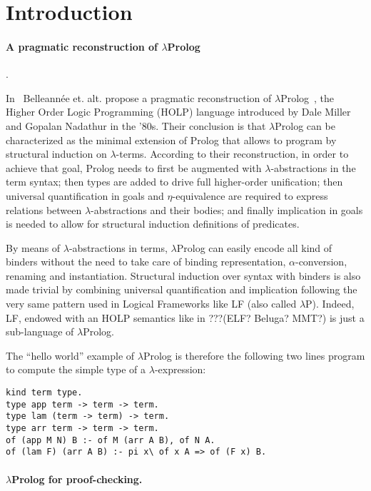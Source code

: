 \documentclass{easychair}
\begin{document}
\section{Introduction}

\paragraph{A pragmatic reconstruction of $\lambda$Prolog}.

In~\cite{jlp98} Belleannée et. alt. propose a pragmatic reconstruction
of $\lambda$Prolog~\cite{lambdap1,lambdap2,lambdap3}, the Higher Order
Logic Programming (HOLP) language introduced by Dale Miller and
Gopalan Nadathur in the '80s.
Their conclusion is that $\lambda$Prolog can be characterized as the
minimal extension of Prolog that allows to program by structural
induction on $\lambda$-terms. According to their reconstruction, in
order to achieve that goal, Prolog needs to first be augmented with
$\lambda$-abstractions in the term syntax; then types are added to
drive full higher-order unification; then universal quantification in
goals and $\eta$-equivalence are required to express relations between
$\lambda$-abstractions and their bodies; and finally implication in
goals is needed to allow for structural induction definitions of
predicates.

By means of $\lambda$-abstractions in terms, $\lambda$Prolog can
easily encode all kind of binders without the need to take care of
binding representation, $\alpha$-conversion, renaming and
instantiation. Structural induction over syntax with binders is also
made trivial by combining universal quantification and implication
following the very same pattern used in Logical Frameworks like LF
(also called $\lambda$P). Indeed, LF, endowed with an HOLP semantics
like in ???(ELF? Beluga? MMT?) is just a sub-language of
$\lambda$Prolog.

The ``hello world'' example of $\lambda$Prolog is therefore the
following two lines program to compute the simple type of a
$\lambda$-expression:

\begin{verbatim}
kind term type.
type app term -> term -> term.
type lam (term -> term) -> term.
type arr term -> term -> term.
of (app M N) B :- of M (arr A B), of N A.
of (lam F) (arr A B) :- pi x\ of x A => of (F x) B.
\end{verbatim}

\paragraph{$\lambda$Prolog for proof-checking.}
\end{document}
